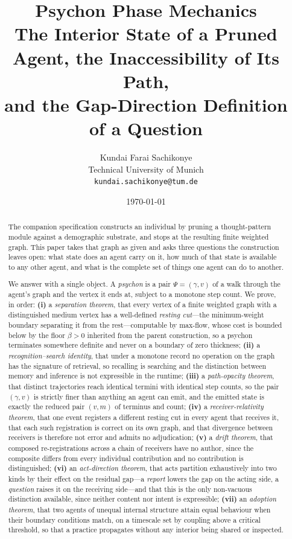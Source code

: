 \documentclass[11pt,a4paper]{article}
\title{\textbf{Psychon Phase Mechanics}\\[6pt]
\large The Interior State of a Pruned Agent, the Inaccessibility of Its Path,\\
and the Gap-Direction Definition of a Question}
\author{Kundai Farai Sachikonye\\
\small Technical University of Munich\\
\small \texttt{kundai.sachikonye@tum.de}}
\date{\today}
\theoremstyle{clstyle}
\theoremstyle{definition}
\theoremstyle{remark}
\newcommand{\flo}{\beta}
\newcommand{\rec}{m}
\newcommand{\Psy}{\Psi}                  %
\newcommand{\traj}{\gamma}               %
\newcommand{\term}{v}                    %
\begin{document}
\maketitle

\begin{abstract}
\noindent
The companion specification constructs an individual by pruning a
thought-pattern module against a demographic substrate, and stops at the
resulting finite weighted graph. This paper takes that graph as given and
asks three questions the construction leaves open: what state does an agent
carry on it, how much of that state is available to any other agent, and
what is the complete set of things one agent can do to another.

We answer with a single object. A \emph{psychon} is a pair
$\Psy=(\traj,\term)$ of a walk through the agent's graph and the vertex it
ends at, subject to a monotone step count. We prove, in order:
\textbf{(i)} a \emph{separation theorem}, that every vertex of a finite
weighted graph with a distinguished medium vertex has a well-defined
\emph{resting cut}---the minimum-weight boundary separating it from the
rest---computable by max-flow, whose cost is bounded below by the floor
$\flo>0$ inherited from the parent construction, so a psychon terminates
somewhere definite and never on a boundary of zero thickness;
\textbf{(ii)} a \emph{recognition--search identity}, that under a monotone
record no operation on the graph has the signature of retrieval, so
recalling is searching and the distinction between memory and inference is
not expressible in the runtime;
\textbf{(iii)} a \emph{path-opacity theorem}, that distinct trajectories
reach identical termini with identical step counts, so the pair
$(\traj,\term)$ is strictly finer than anything an agent can emit, and the
emitted state is exactly the reduced pair $(\term,\rec)$ of terminus and
count;
\textbf{(iv)} a \emph{receiver-relativity theorem}, that one event
registers a different resting cut in every agent that receives it, that
each such registration is correct on its own graph, and that divergence
between receivers is therefore not error and admits no adjudication;
\textbf{(v)} a \emph{drift theorem}, that composed re-registrations across
a chain of receivers have no author, since the composite differs from every
individual contribution and no contribution is distinguished;
\textbf{(vi)} an \emph{act-direction theorem}, that acts partition
exhaustively into two kinds by their effect on the residual gap---a
\emph{report} lowers the gap on the acting side, a \emph{question} raises it
on the receiving side---and that this is the only non-vacuous distinction
available, since neither content nor intent is expressible;
\textbf{(vii)} an \emph{adoption theorem}, that two agents of unequal
internal structure attain equal behaviour when their boundary conditions
match, on a timescale set by coupling above a critical threshold, so that
a practice propagates without any interior being shared or inspected.


\end{abstract}
\end{document}
